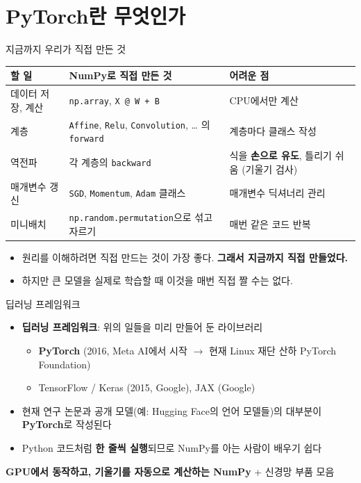 \documentclass[aspectratio=169,11pt]{beamer}
\newcommand{\code}[1]{\texttt{#1}}
\begin{document}
\section{PyTorch란 무엇인가}

\begin{frame}{지금까지 우리가 직접 만든 것}
\centering
\small
\renewcommand{\arraystretch}{1.25}
\begin{tabular}{>{\raggedright}p{3.2cm}>{\raggedright}p{5.2cm}>{\raggedright\arraybackslash}p{4.6cm}}
\toprule
\textbf{할 일} & \textbf{NumPy로 직접 만든 것} & \textbf{어려운 점} \\
\midrule
데이터 저장, 계산 & \code{np.array}, \code{X @ W + B} & CPU에서만 계산 \\
계층 & \code{Affine}, \code{Relu}, \code{Convolution}, \ldots{} 의 \code{forward} & 계층마다 클래스 작성 \\
역전파 & 각 계층의 \code{backward} & 식을 \textbf{손으로 유도}, 틀리기 쉬움 (기울기 검사) \\
매개변수 갱신 & \code{SGD}, \code{Momentum}, \code{Adam} 클래스 & 매개변수 딕셔너리 관리 \\
미니배치 & \code{np.random.permutation}으로 섞고 자르기 & 매번 같은 코드 반복 \\
\bottomrule
\end{tabular}
\vskip3mm
\raggedright
\begin{itemize}
\item 원리를 이해하려면 직접 만드는 것이 가장 좋다. \textbf{그래서 지금까지 직접 만들었다.}
\item 하지만 큰 모델을 실제로 학습할 때 이것을 매번 직접 짤 수는 없다.
\end{itemize}
\end{frame}

\begin{frame}{딥러닝 프레임워크}
\begin{itemize}
\item \textbf{딥러닝 프레임워크}: 위의 일들을 미리 만들어 둔 라이브러리
\begin{itemize}
\item \textbf{PyTorch} (2016, Meta AI에서 시작 $\to$ 현재 Linux 재단 산하 PyTorch Foundation)
\item TensorFlow / Keras (2015, Google), JAX (Google)
\end{itemize}
\item 현재 연구 논문과 공개 모델(예: Hugging Face의 언어 모델들)의 대부분이 \textbf{PyTorch}로 작성된다
\item Python 코드처럼 \textbf{한 줄씩 실행}되므로 NumPy를 아는 사람이 배우기 쉽다
\end{itemize}
\vskip2mm
\begin{keybox}
\textbf{GPU에서 동작하고, 기울기를 자동으로 계산하는 NumPy} \;+\; 신경망 부품 모음
\end{keybox}
\end{frame}
\end{document}
